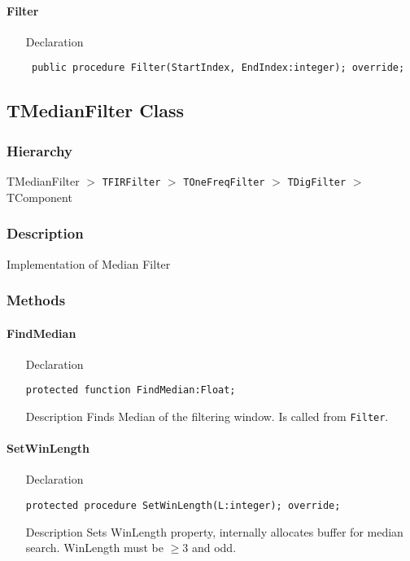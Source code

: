 \documentclass[12pt,a4paper,oneside]{report}
\newcommand{\declarationitem}[1]{{\addfontfeatures{FakeBold=1.3} #1}}
\newcommand{\descriptiontitle}[1]{{\addfontfeatures{FakeSlant}#1}}
\newcommand{\code}[1]{\texttt{#1}}
\begin{document}
\paragraph{Filter}\hspace*{\fill}
\label{lmfilters.TGaussFilter-Filter}
\begin{itemize}\item[\declarationitem{Declaration}\hfill]
	\begin{flushleft}
		\code{
			public procedure Filter(StartIndex, EndIndex:integer); override;}
	\end{flushleft}
\end{itemize}
\subsection{TMedianFilter Class}
\label{lmfilters.TMedianFilter}
\subsubsection{Hierarchy}
TMedianFilter {$>$} \code{TFIRFilter} {$>$} \code{TOneFreqFilter} {$>$} \code{TDigFilter} {$>$} TComponent
\subsubsection{Description}
Implementation of Median Filter
\subsubsection{Methods}
\paragraph{FindMedian}\hspace*{\fill}
\label{lmfilters.TMedianFilter-FindMedian}
\begin{itemize}\item[\declarationitem{Declaration}\hfill]
	\begin{flushleft}
		\code{protected function FindMedian:Float;}
	\end{flushleft}
\item[\descriptiontitle{Description}] Finds Median of the filtering window. Is called from \code{Filter}.
\end{itemize}
\paragraph{SetWinLength}\hspace*{\fill}
\label{lmfilters.TMedianFilter-SetWinLength}
\begin{itemize}\item[\declarationitem{Declaration}\hfill]
	\begin{flushleft}
		\code{protected procedure SetWinLength(L:integer); override;}
	\end{flushleft}
\item[\descriptiontitle{Description}] Sets WinLength property, internally allocates buffer for median search. WinLength must be $\ge 3$ and odd.
\end{itemize}
\end{document}

